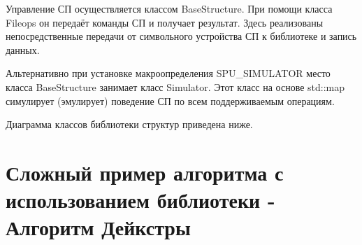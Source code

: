 Управление СП осуществляется классом {\ttfamily Base\+Structure}. При помощи класса {\ttfamily Fileops} он передаёт команды СП и получает результат. Здесь реализованы непосредственные передачи от символьного устройства СП к библиотеке и запись данных.

Альтернативно при установке макроопределения {\ttfamily S\+P\+U\+\_\+\+S\+I\+M\+U\+L\+A\+T\+OR} место класса {\ttfamily Base\+Structure} занимает класс {\ttfamily Simulator}. Этот класс на основе {\ttfamily std\+::map} симулирует (эмулирует) поведение СП по всем поддерживаемым операциям.

Диаграмма классов библиотеки структур приведена ниже.

 

\hypertarget{md_spu-api__readme_autotoc_md32}{}\section{Сложный пример алгоритма с использованием библиотеки -\/ Алгоритм Дейкстры}\label{md_spu-api__readme_autotoc_md32}

